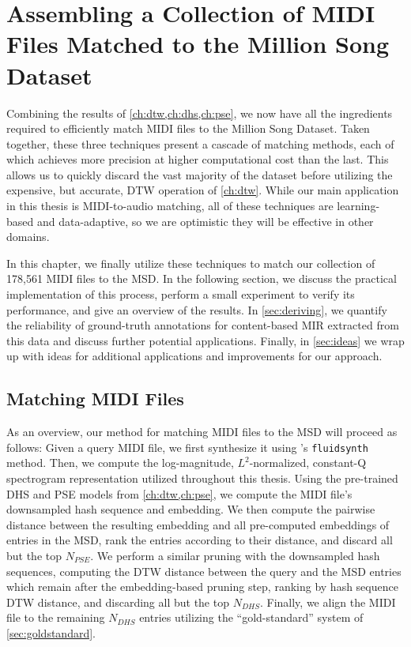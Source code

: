 \chapter{Assembling a Collection of MIDI Files Matched to the Million Song Dataset}
\label{ch:assembling}

Combining the results of \cref{ch:dtw,ch:dhs,ch:pse}, we now have all the ingredients required to efficiently match MIDI files to the Million Song Dataset.
Taken together, these three techniques present a cascade of matching methods, each of which achieves more precision at higher computational cost than the last.
This allows us to quickly discard the vast majority of the dataset before utilizing the expensive, but accurate, DTW operation of \cref{ch:dtw}.
While our main application in this thesis is MIDI-to-audio matching, all of these techniques are learning-based and data-adaptive, so we are optimistic they will be effective in other domains.

In this chapter, we finally utilize these techniques to match our collection of 178,561 MIDI files to the MSD.
In the following section, we discuss the practical implementation of this process, perform a small experiment to verify its performance, and give an overview of the results.
In \cref{sec:deriving}, we quantify the reliability of ground-truth annotations for content-based MIR extracted from this data and discuss further potential applications.
Finally, in \cref{sec:ideas} we wrap up with ideas for additional applications and improvements for our approach.

\section{Matching MIDI Files}

As an overview, our method for matching MIDI files to the MSD will proceed as follows:
Given a query MIDI file, we first synthesize it using \prettymidi{}'s \texttt{fluidsynth} method.
Then, we compute the log-magnitude, $L^2$-normalized, constant-Q spectrogram representation utilized throughout this thesis.
Using the pre-trained DHS and PSE models from \cref{ch:dtw,ch:pse}, we compute the MIDI file's downsampled hash sequence and embedding.
We then compute the pairwise distance between the resulting embedding and all pre-computed embeddings of entries in the MSD, rank the entries according to their distance, and discard all but the top $N_{PSE}$.
We perform a similar pruning with the downsampled hash sequences, computing the DTW distance between the query and the MSD entries which remain after the embedding-based pruning step, ranking by hash sequence DTW distance, and discarding all but the top $N_{DHS}$.
Finally, we align the MIDI file to the remaining $N_{DHS}$ entries utilizing the ``gold-standard'' system of \cref{sec:goldstandard}.

